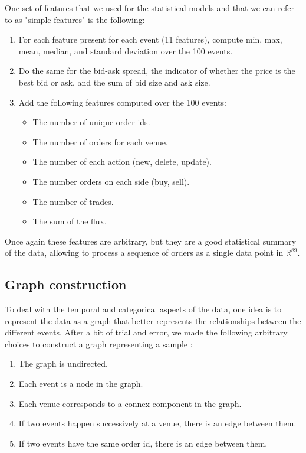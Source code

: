 \documentclass[switch, 11pt]{article}
\newcommand{\R}{\mathbb{R}}
\begin{document}
\begin{multicols}{2}
    One set of features that we used for the statistical models and that we can refer to as "simple features" is the following:
    \begin{enumerate}
        \item For each feature present for each event (11 features), compute min, max, mean, median, and standard deviation over the 100 events.
        \item Do the same for the bid-ask spread, the indicator of whether the price is the best bid or ask, and the sum of bid size and ask size.
        \item Add the following features computed over the 100 events:
              \begin{itemize}
                  \item The number of unique order ids.
                  \item The number of orders for each venue.
                  \item The number of each action (new, delete, update).
                  \item The number orders on each side (buy, sell).
                  \item The number of trades.
                  \item The sum of the flux.
              \end{itemize}
    \end{enumerate}
    Once again these features are arbitrary, but they are a good statistical summary of the data, allowing to process a sequence of orders as a single data point in $\R^{89}$.

    \subsection{Graph construction}

    To deal with the temporal and categorical aspects of the data, one idea is to represent the data as a graph that better represents the relationships between the different events. After a bit of trial and error, we made the following arbitrary choices to construct a graph representing a sample :
    \begin{enumerate}
        \item The graph is undirected.
        \item Each event is a node in the graph.
        \item Each venue corresponds to a connex component in the graph.
        \item If two events happen successively at a venue, there is an edge between them.
        \item If two events have the same order id, there is an edge between them.
    \end{enumerate}


\end{multicols}
\end{document}
